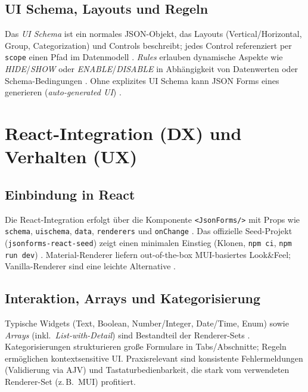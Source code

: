 \documentclass[11pt,a4paper]{article}
\begin{document}
\subsection{UI Schema, Layouts und Regeln}
Das \emph{UI Schema} ist ein normales JSON-Objekt, das Layouts (Vertical/Horizontal, Group, Categorization) und Controls beschreibt; jedes Control referenziert per \texttt{scope} einen Pfad im Datenmodell \cite{jsonforms-uischema}. \emph{Rules} erlauben dynamische Aspekte wie \emph{HIDE}/\emph{SHOW} oder \emph{ENABLE}/\emph{DISABLE} in Abh\"angigkeit von Datenwerten oder Schema-Bedingungen \cite{jsonforms-rules}. Ohne explizites UI Schema kann JSON Forms eines generieren (\emph{auto-generated UI}) \cite{jsonforms-react}.

\section{React-Integration (DX) und Verhalten (UX)}
\subsection{Einbindung in React}
Die React-Integration erfolgt \"uber die Komponente \texttt{<JsonForms/>} mit Props wie \texttt{schema}, \texttt{uischema}, \texttt{data}, \texttt{renderers} und \texttt{onChange} \cite{jsonforms-react}. Das offizielle Seed-Projekt (\texttt{jsonforms-react-seed}) zeigt einen minimalen Einstieg (Klonen, \texttt{npm ci}, \texttt{npm run dev}) \cite{jsonforms-getting-started,seed-react}. Material-Renderer liefern out-of-the-box MUI-basiertes Look\&Feel; Vanilla-Renderer sind eine leichte Alternative \cite{jsonforms-material}.

\subsection{Interaktion, Arrays und Kategorisierung}
Typische Widgets (Text, Boolean, Number/Integer, Date/Time, Enum) sowie \emph{Arrays} (inkl.\ \emph{List-with-Detail}) sind Bestandteil der Renderer-Sets \cite{jsonforms-examples}. Kategorisierungen strukturieren gro{\ss}e Formulare in Tabs/Abschnitte; Regeln erm\"oglichen kontextsensitive UI. Praxisrelevant sind konsistente Fehlermeldungen (Validierung via AJV) und Tastatur\-bedienbarkeit, die stark vom verwendeten Renderer-Set (z.\,B.\ MUI) profitiert.
\end{document}
